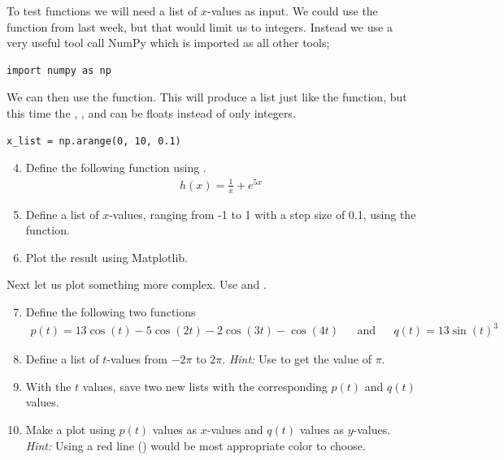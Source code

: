 \documentclass{article}
\begin{document}
To test functions we will need a list of $x$-values as input.
We could use the  function from last week, but that would limit us to integers. Instead we use a very useful tool call NumPy which is imported as all other tools;

\begin{lstlisting}
import numpy as np
\end{lstlisting}

We can then use the  function.
This will produce a list just like the  function, but this time the
,
, and
can be floats instead of only integers.

\begin{lstlisting}
x_list = np.arange(0, 10, 0.1)
\end{lstlisting}

\begin{enumerate}
  \setcounter{enumi}{3}
  \item Define the following function using .
    \begin{align}
        h(x) = \frac{1}{x} + e^{5x}
    \end{align}

  \item Define a list of $x$-values, ranging from -1 to 1 with a step size of 0.1, using the  function.

  \item Plot the result using Matplotlib.

\end{enumerate}

Next let us plot something more complex. Use  and .

\begin{enumerate}
    \setcounter{enumi}{6}
    \item Define the following two functions
    \begin{align}
         p(t) = 13\cos(t) - 5 \cos(2t) - 2 \cos(3t) - \cos(4t) && \text{and} && q(t) = 13\sin(t)^3 
    \end{align}

    \item Define a list of $t$-values from $-2\pi$ to $2\pi$.
      {\em Hint:} Use  to get the value of $\pi$.

    \item With the $t$ values, save two new lists with the corresponding $p(t)$ and $q(t)$ values.

    \item Make a plot using $p(t)$ values as $x$-values and $q(t)$ values as $y$-values.
        {\em Hint:} Using a red line () would be most appropriate color to choose.


\end{enumerate}
\end{document}
